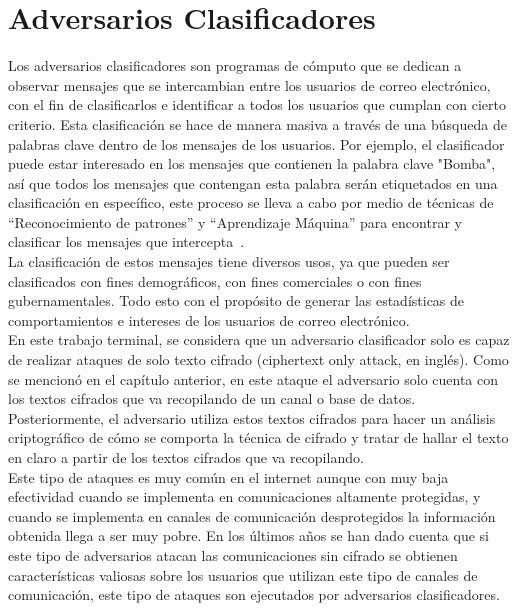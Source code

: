 \chapter{Adversarios Clasificadores}



Los adversarios clasificadores son programas de c\'omputo que se dedican a observar  mensajes que se intercambian  entre  los  usuarios  de  correo  electrónico,  con  el  fin  de  clasificarlos  e 
identificar  a  todos  los  usuarios  que  cumplan  con  cierto  criterio.  Esta  clasificación  se hace de manera masiva a trav\'es de  una búsqueda de palabras clave dentro de 
los  mensajes de  los usuarios. Por ejemplo, el  clasificador puede estar interesado en  los mensajes  que  contienen  la  palabra  clave  "Bomba",  así  que 
todos  los  mensajes  que contengan esta palabra serán etiquetados en una clasificación en específico, este proceso se lleva a cabo por medio de técnicas de 
“Reconocimiento de patrones” y “Aprendizaje Máquina” para encontrar y clasificar los mensajes 
que intercepta~\cite{clas,Attacks}.
\\
La  clasificación  de  estos  mensajes  tiene  diversos  usos, ya  que  pueden  ser  clasificados con  fines demográficos, con  fines comerciales o con  fines gubernamentales. Todo esto 
con  el  propósito  de  generar  las  estadísticas  de  comportamientos  e  intereses  de  los usuarios de correo electrónico. \\




En este trabajo terminal, se considera que un adversario clasificador solo es capaz de realizar ataques de solo texto cifrado (ciphertext only attack, en ingl\'es). Como se mencion\'o en el cap\'itulo anterior, en este ataque  el adversario solo  cuenta  con  los  textos  cifrados  que  va  recopilando  de  un  canal  o  base  de 
datos. Posteriormente, el adversario utiliza  estos  textos  cifrados  para  hacer  un  análisis  criptográfico  de  cómo  se comporta la técnica de cifrado  y tratar de hallar el texto en claro a partir de los textos cifrados que va recopilando. 
\\
Este  tipo  de  ataques  es  muy  común  en  el  internet  aunque  con  muy  baja  efectividad cuando   se   implementa   en   comunicaciones   altamente   protegidas,   y   cuando   se 
implementa en canales de comunicación desprotegidos  la  información obtenida  llega  a ser  muy  pobre.  En  los  últimos  años  se  han  dado  cuenta  que  si   este  tipo  de 
adversarios   atacan las  comunicaciones  sin  cifrado se  obtienen  características  valiosas  sobre  los usuarios  que  utilizan  este  tipo  de  canales  de  comunicación,  este  tipo  de  ataques  son 
ejecutados por  adversarios clasificadores.\\


